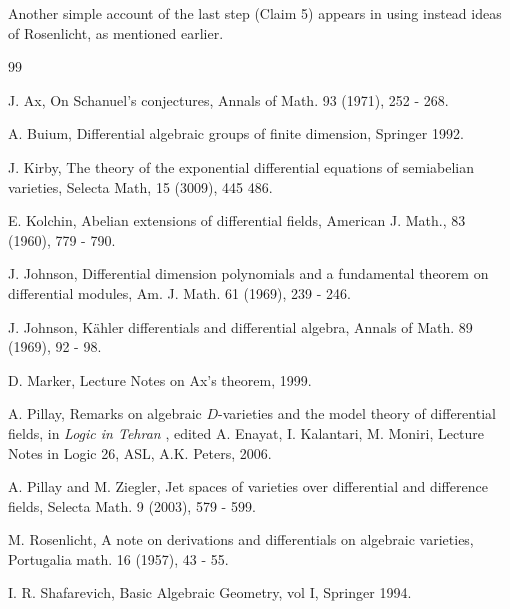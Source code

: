 \documentclass[12pt]{article}
\begin{document}
\vspace{5mm}
\noindent
Another simple account of the last step  (Claim 5) appears  in \cite{Marker}  using instead ideas of Rosenlicht, as mentioned earlier.








\begin{thebibliography}{99}

 J. Ax, On Schanuel's conjectures,  Annals of Math. 93 (1971), 252 - 268. 

 A. Buium, Differential algebraic groups of finite dimension, Springer 1992. 

 J. Kirby, The theory of the exponential differential equations of semiabelian varieties, Selecta Math, 15 (3009), 445 486. 

  E. Kolchin,  Abelian extensions of differential fields, American J. Math., 83 (1960), 779 - 790.

 J. Johnson, Differential dimension polynomials and a fundamental theorem on differential modules, Am. J. Math. 61 (1969), 239 - 246. 

 J. Johnson, K\"ahler differentials and differential algebra, Annals of Math. 89 (1969), 92 - 98. 

 D. Marker,  Lecture Notes on Ax's theorem, 1999. 

 A. Pillay, Remarks on algebraic $D$-varieties and the model theory of differential fields, in {\em Logic in Tehran} , edited A. Enayat, I. Kalantari, M. Moniri, Lecture Notes in Logic 26,  ASL, A.K. Peters, 2006. 

 A. Pillay and M. Ziegler,  Jet spaces of varieties over differential and difference fields, Selecta Math. 9 (2003), 579 - 599.

  M. Rosenlicht, A note on derivations and differentials on algebraic varieties, Portugalia math. 16 (1957), 43 - 55. 


 I. R. Shafarevich, Basic Algebraic Geometry, vol I,  Springer 1994. 


\end{thebibliography}
\end{document}
